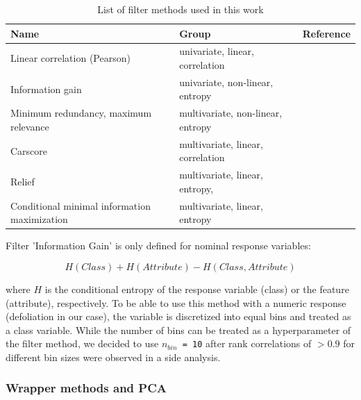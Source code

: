 \documentclass[letterpaper, peerreview]{IEEEtran}
\begin{document}
\begin{table}[b!]
\centering
\caption[t]{List of filter methods used in this work}
\begingroup\footnotesize
\begin{adjustbox}{width={0.48\textwidth},totalheight={\textheight},keepaspectratio}
	\begin{tabular}{lll}
		\\
		Name                                         & Group                             & Reference          \\
		\toprule
		Linear correlation (Pearson)                 & univariate, linear, correlation   &\cite{pearson1901} \\
		Information gain                             & univariate, non-linear, entropy   &\cite{quinlan1986} \\
		Minimum redundancy, maximum relevance        & multivariate, non-linear, entropy &\cite{zhao2013}    \\
		Carscore                                     & multivariate, linear, correlation &\cite{zuber2011}   \\
		Relief                                       & multivariate, linear, entropy,    &\cite{kira1992}    \\
		Conditional minimal information maximization & multivariate, linear, entropy     &\cite{fleuret2004}
	\end{tabular}
\end{adjustbox}
\endgroup\label{tab:filter-methods}
\end{table}

\noindent Filter 'Information Gain' is only defined for nominal response variables:

\begin{equation}
	H(Class) + H(Attribute) - H(Class, Attribute)
\end{equation}

where \(H\) is the conditional entropy of the response variable (class) or the feature (attribute), respectively.
To be able to use this method with a numeric response (defoliation in our case), the variable is discretized into equal bins and treated as a class variable.
While the number of bins can be treated as a hyperparameter of the filter method, we decided to use \texttt{\(n_{bin}\) = 10} after rank correlations of $> 0.9$ for different bin sizes were observed in a side analysis.

\subsubsection{Wrapper methods and PCA}
\end{document}
